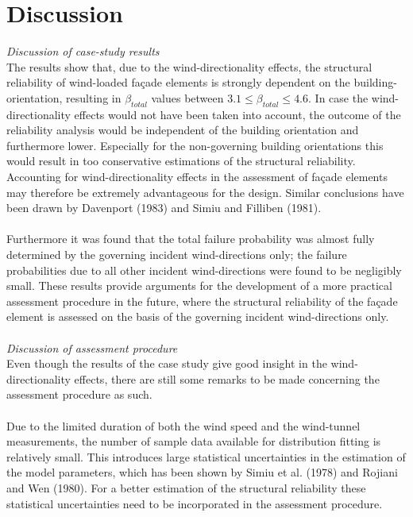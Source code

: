 \section{Discussion}\label{discussion}
\textit{Discussion of case-study results}\\
The results show that, due to the wind-directionality effects, the  structural reliability of wind-loaded fa\c{c}ade elements is strongly dependent on the building-orientation, resulting in $\beta_{total}$ values between $3.1\leq\beta_{total}\leq4.6$. In case the wind-directionality effects would not have been taken into account, the outcome of the reliability analysis would be independent of the building orientation and furthermore lower. Especially for the non-governing building orientations this would result in too conservative estimations of the structural reliability. Accounting for wind-directionality effects in the assessment of fa\c{c}ade elements may therefore be extremely advantageous for the design. Similar conclusions have been drawn by Davenport (1983) and Simiu and Filliben (1981).  \\
\\
Furthermore it was found that the total failure probability was almost fully determined by the governing incident wind-directions only; the failure probabilities due to all other incident wind-directions were found to be negligibly small. These results provide arguments for the development of a more practical assessment procedure in the future, where the structural reliability of the fa\c{c}ade element is assessed on the basis of the governing incident wind-directions only. \\
\\
\textit{Discussion of assessment procedure}\\
Even though the results of the case study give good insight in the wind-directionality effects, there are still some remarks to be made concerning the assessment procedure as such. \\
\\
Due to the limited duration of both the wind speed and the wind-tunnel measurements,  the number of sample data available for distribution fitting is relatively small. This introduces large statistical uncertainties in the estimation of the model parameters, which has been shown by Simiu et al. (1978) and Rojiani and Wen (1980). For a better estimation of the structural reliability these statistical uncertainties need to be incorporated in the assessment procedure. \\
